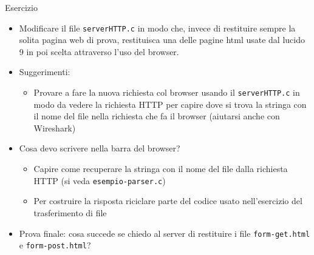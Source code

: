 \documentclass[11pt]{article}
\begin{document}
\begin{tcolorbox}[colback=blue!5!white,colframe=blue!75!black,title=\textbf{DOMANDA}, breakable]
Esercizio
\begin{itemize}
    \item Modificare il file \texttt{serverHTTP.c} in modo che, invece di restituire sempre la solita pagina web di prova, restituisca una delle pagine html usate dal lucido 9 in poi scelta attraverso l'uso del browser.
    \item Suggerimenti:
    \begin{itemize}
        \item Provare a fare la nuova richiesta col browser usando il \texttt{serverHTTP.c} in modo da vedere la richiesta HTTP per capire dove si trova la stringa con il nome del file nella richiesta che fa il browser (aiutarsi anche con Wireshark)
    \end{itemize}
    \item Cosa devo scrivere nella barra del browser?
    \begin{itemize}
        \item Capire come recuperare la stringa con il nome del file dalla richiesta HTTP (si veda \texttt{esempio-parser.c})
        \item Per costruire la risposta riciclare parte del codice usato nell'esercizio del trasferimento di file
    \end{itemize}
    \item Prova finale: cosa succede se chiedo al server di restituire i file \texttt{form-get.html} e \texttt{form-post.html}?
\end{itemize}
\end{tcolorbox}
\end{document}
